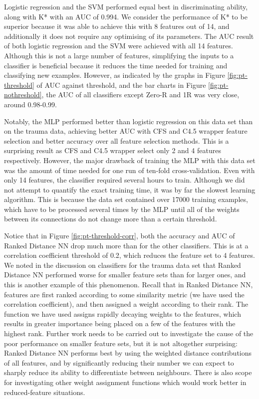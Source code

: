 

Logistic regression and the SVM performed equal best in discriminating ability,
along with K* with an AUC of 0.994. We consider the performance of K* to be
superior because it was able to achieve this with 8 features out of 14, and
additionally it does not require any optimising of its parameters.
The AUC result of both logistic regression and the SVM were achieved with all
14 features. Although this is not a large number of features, simplifying the
inputs to a classifier is beneficial because it reduces the time needed for
training and classifying new examples. However, as indicated by the graphs in
Figure \ref{fig:pt-threshold} of AUC against threshold, and the bar charts in
Figure \ref{fig:pt-nothreshold}, the AUC of all classifiers except Zero-R and
1R was very close, around 0.98-0.99.

Notably, the MLP performed better than logistic regression on this data set
than on the trauma data, achieving better AUC with CFS and C4.5 wrapper feature
selection and better accuracy over all feature selection methods. This is a
surprising result as CFS and C4.5 wrapper select only 2 and 4 features
respectively. However, the major drawback of training the MLP with this data
set was the amount of time needed for one run of ten-fold cross-validation.
Even with only 14 features, the classifier required several hours to train.
Although we did not attempt to quantify the exact training time, it was by far
the slowest learning algorithm.
This is because the data set contained over 17000 training examples, which have
to be processed several times by the MLP until all of the weights between its
connections do not change more than a certain threshold.

Notice that in Figure \ref{fig:pt-threshold-corr}, both the accuracy and AUC
of Ranked Distance NN drop much more than for the other classifiers. This is at
a correlation coefficient threshold of 0.2, which reduces the feature set to
4 features. We noted in the discussion on classifiers for the trauma data set
that Ranked Distance NN performed worse for smaller feature sets than for larger
ones, and this is another example of this phenomenon. Recall that in Ranked
Distance NN, features are first ranked according to some similarity metric (we
have used the correlation coefficient), and then assigned a weight according
to their rank. The function we have used assigns rapidly decaying weights to
the features, which results in greater importance being placed on a few of
the features with the highest rank. Further work needs to be carried out to
investigate the cause of the poor performance on smaller feature sets, but
it is not altogether surprising: Ranked Distance NN performs best by using the
weighted distance contributions of all features, and by significantly reducing
their number we can expect to sharply reduce its ability to differentiate
between neighbours. There is also scope for investigating other weight
assignment functions which would work better in reduced-feature situations.

